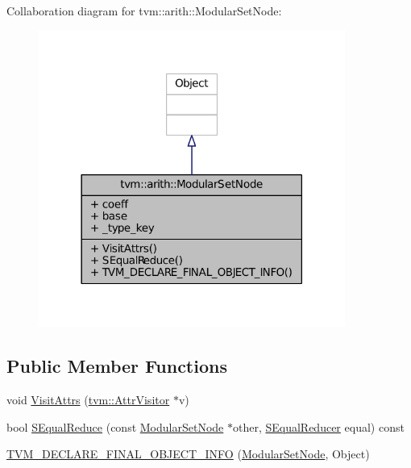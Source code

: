 Collaboration diagram for tvm\+:\+:arith\+:\+:Modular\+Set\+Node\+:
\nopagebreak
\begin{figure}[H]
\begin{center}
\leavevmode
\includegraphics[width=285pt]{classtvm_1_1arith_1_1ModularSetNode__coll__graph}
\end{center}
\end{figure}
\subsection*{Public Member Functions}
\begin{DoxyCompactItemize}
\item 
void \hyperlink{classtvm_1_1arith_1_1ModularSetNode_a5b5bf53e26881ec83777f2a3c41a4031}{Visit\+Attrs} (\hyperlink{classtvm_1_1AttrVisitor}{tvm\+::\+Attr\+Visitor} $\ast$v)
\item 
bool \hyperlink{classtvm_1_1arith_1_1ModularSetNode_a04a38e5207637fda175b031e3b569349}{S\+Equal\+Reduce} (const \hyperlink{classtvm_1_1arith_1_1ModularSetNode}{Modular\+Set\+Node} $\ast$other, \hyperlink{classtvm_1_1SEqualReducer}{S\+Equal\+Reducer} equal) const 
\item 
\hyperlink{classtvm_1_1arith_1_1ModularSetNode_aaf398fe14003c53e0452dfde19fd1404}{T\+V\+M\+\_\+\+D\+E\+C\+L\+A\+R\+E\+\_\+\+F\+I\+N\+A\+L\+\_\+\+O\+B\+J\+E\+C\+T\+\_\+\+I\+N\+FO} (\hyperlink{classtvm_1_1arith_1_1ModularSetNode}{Modular\+Set\+Node}, Object)
\end{DoxyCompactItemize}
